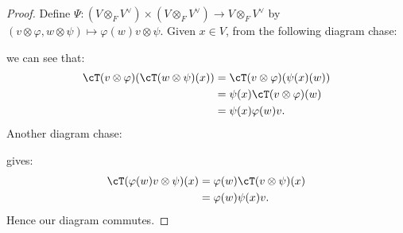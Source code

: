         \begin{proof}
            Define $\Psi: (V \otimes_F V^\vee) \times (V \otimes_F V^\vee) \rightarrow V \otimes_F V^\vee$ by $(v \otimes \varphi, w \otimes \psi) \mapsto \varphi(w)v \otimes \psi$. Given $x \in V$, from the following diagram chase:
                \begin{center}
                \end{center}
            we can see that:
                \begin{equation*}
                \begin{split}
                    \cT(v \otimes \varphi)(\cT(w \otimes \psi)(x))
                    & = \cT(v \otimes \varphi)(\psi(x)(w)) \\
                    & = \psi(x)\cT(v \otimes \varphi)(w) \\
                    & = \psi(x)\varphi(w)v.
                \end{split}
                \end{equation*}
            Another diagram chase:
                \begin{center}
                \end{center}
            gives:
                \begin{equation*}
                \begin{split}
                    \cT(\varphi(w)v \otimes \psi)(x)
                    & = \varphi(w)\cT(v \otimes \psi)(x) \\
                    & = \varphi(w)\psi(x)v.
                \end{split}
                \end{equation*}
            Hence our diagram commutes.
        \end{proof}

